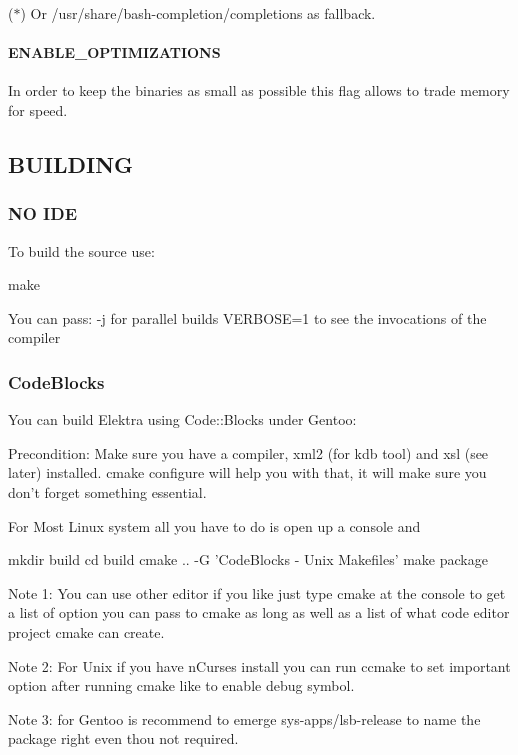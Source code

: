 ($\ast$) Or {\ttfamily /usr/share/bash-\/completion/completions} as fallback.

\paragraph*{E\+N\+A\+B\+L\+E\+\_\+\+O\+P\+T\+I\+M\+I\+Z\+A\+T\+I\+O\+N\+S}

In order to keep the binaries as small as possible this flag allows to trade memory for speed.

\subsection*{B\+U\+I\+L\+D\+I\+N\+G}

\subsubsection*{N\+O I\+D\+E}

To build the source use\+: \begin{DoxyVerb}make
\end{DoxyVerb}


You can pass\+: -\/j for parallel builds V\+E\+R\+B\+O\+S\+E=1 to see the invocations of the compiler

\subsubsection*{Code\+Blocks}

You can build Elektra using Code\+::\+Blocks under Gentoo\+:

Precondition\+: Make sure you have a compiler, xml2 (for kdb tool) and xsl (see later) installed. cmake configure will help you with that, it will make sure you don't forget something essential.

For Most Linux system all you have to do is open up a console and \begin{DoxyVerb}    mkdir build
    cd build
    cmake .. -G 'CodeBlocks - Unix Makefiles'
    make package
\end{DoxyVerb}


Note 1\+: You can use other editor if you like just type cmake at the console to get a list of option you can pass to cmake as long as well as a list of what code editor project cmake can create.

Note 2\+: For Unix if you have n\+Curses install you can run ccmake to set important option after running cmake like to enable debug symbol.

Note 3\+: for Gentoo is recommend to emerge sys-\/apps/lsb-\/release to name the package right even thou not required. 